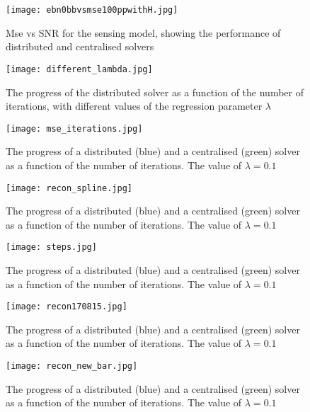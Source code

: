 \begin{figure}[h]
\centering
\texttt{[image: ebn0bbvsmse100ppwithH.jpg]}
\caption{Mse vs SNR for the sensing model, showing the performance of distributed and centralised solvers}
\label{msevssnr1}
\end{figure}

\begin{figure}[h]
\centering
\texttt{[image: different\_lambda.jpg]}
\caption{The progress of the distributed solver as a function of the number of iterations, with different values of the regression parameter \(\lambda\)}
\label{fig:differentLambda}
\end{figure}

\begin{figure}[h]
\centering
\texttt{[image: mse\_iterations.jpg]}
\caption{The progress of a distributed (blue) and a centralised (green) solver as a function of the number of iterations. The value of \(\lambda = 0.1\)}
\label{fig:erroriterations}
\end{figure}

\begin{figure}[h]
\centering
\texttt{[image: recon\_spline.jpg]}
\caption{The progress of a distributed (blue) and a centralised (green) solver as a function of the number of iterations. The value of \(\lambda = 0.1\)}
\label{fig:spline_recon}
\end{figure}

\begin{figure}[h]
\centering
\texttt{[image: steps.jpg]}
\caption{The progress of a distributed (blue) and a centralised (green) solver as a function of the number of iterations. The value of \(\lambda = 0.1\)}
\label{fig:steps_wavelets}
\end{figure}

\begin{figure}[h]
\centering
\texttt{[image: recon170815.jpg]}
\caption{The progress of a distributed (blue) and a centralised (green) solver as a function of the number of iterations. The value of \(\lambda = 0.1\)}
\label{fig:wavelet_recon}
\end{figure}

\begin{figure}[h]
\centering
\texttt{[image: recon\_new\_bar.jpg]}
\caption{The progress of a distributed (blue) and a centralised (green) solver as a function of the number of iterations. The value of \(\lambda = 0.1\)}
\label{fig:wavelet_recon_no_pwer_2}
\end{figure}

